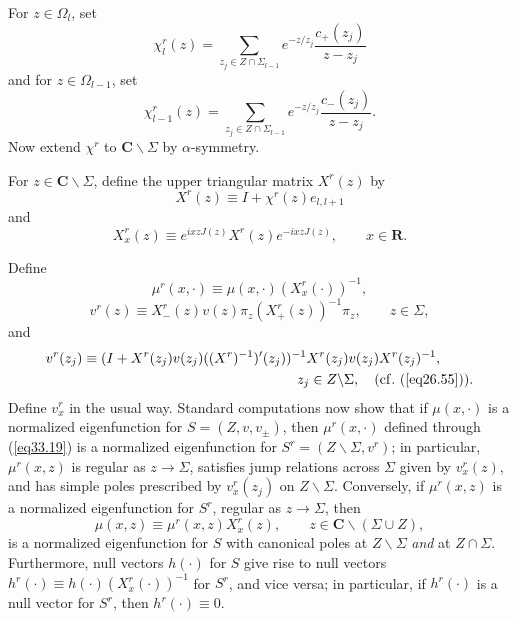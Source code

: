 \documentclass{surv-l}
\theoremstyle{plain}
\theoremstyle{definition}
\numberwithin{equation}{chapter}
\begin{document}
For $z\in\Omega_{l}$, set
\begin{equation*}
\chi_{l}^{r}(z)=\sum_{z_{j}\in Z\cap\Sigma_{l-1}}e^{-z/z_{j}}\frac{c_{+}(z_{j})}{z-z_{j}}
\end{equation*}
and for $z\in\Omega_{l-1}$, set
\begin{equation*}
\chi_{l-1}^{r}(z)=\sum_{z_{j}\in Z\cap\Sigma_{l-1}}e^{-z/z_{j}}\frac{c_{-}(z_{j})}{z-z_{j}}.
\end{equation*}
Now extend $\chi^{r}$ to $ \mathbf{C}\backslash \Sigma$ by $\alpha$-symmetry.

For $ z\in \mathbf{C}\backslash \Sigma$, define the upper triangular matrix $X^{r}(z)$ by
\setcounter{equation}{16}
\begin{equation}\label{eq33.17}
X^{r}(z)\equiv I+\chi^{r}(z)e_{l,l+1}
\end{equation}
and
\begin{equation}\label{eq33.18}
X_{x}^{r}(z)\equiv e^{ixzJ(z)}X^{r}(z)e^{-ixzJ(z)},\qquad x\in \mathbf{R}.
\end{equation}

Define
\begin{equation}\label{eq33.19}
\mu^{r}(x, \cdot)\equiv\mu(x, \cdot)(X_{x}^{r}(\cdot))^{-1},
\end{equation}
\begin{equation}\label{eq33.20}
v^{r}(z)\equiv X_{-}^{r}(z)v(z)\pi_{z}(X_{+}^{r}(z))^{-1}\pi_{z},\qquad  z\in\Sigma,
\end{equation}
and
\begin{align}\label{eq33.21}
& v^{r}(z_{j})\equiv(I+X^{r}(z_{j})v(z_{j})((X^{r})^{-1})'(z_{j}))^{-1}X^{r}(z_{j})v(z_{j})X^{r}(z_{j})^{-1},\\ \nonumber
&\qquad\qquad\qquad\qquad\qquad\qquad\qquad\qquad\qquad z_{j}\in Z\backslash \Sigma,\quad (\mathrm{cf}.\ (\ref{eq26.55})).
 \end{align}
Define $v_{x}^{r}$ in the usual way. Standard computations now show that if $\mu(x, \cdot)$ is a normalized eigenfunction for $S=(Z, v, v_{\pm})$, then $\mu^{r}(x, \cdot)$ defined through (\ref{eq33.19}) is a normalized eigenfunction for $S^{r}=(Z\backslash \Sigma, v^{r})$; in particular, $\mu^{r}(x, z)$ is regular as $ z\rightarrow\Sigma$, satisfies jump relations across $\Sigma$ given by $v_{x}^{r}(z)$, and has simple poles prescribed by $v_{x}^{r}(z_{j})$ on $ Z\backslash \Sigma$. Conversely, if $\mu^{r}(x, z)$ is a normalized eigenfunction for $S^{r}$, regular as $ z\rightarrow\Sigma$, then
\begin{equation}\label{eq33.22}
\mu(x,z)\equiv\mu^{r}(x, z)X_{x}^{r}(z),\qquad z\in \mathbf{C}\backslash (\Sigma\cup Z),
\end{equation}
is a normalized eigenfunction for $S$ with canonical poles at $ Z\backslash \Sigma$ \emph{and} at $ Z\cap\Sigma$. Furthermore, null vectors $h(\cdot)$ for $S$ give rise to null vectors $h^{r}(\cdot)\equiv h(\cdot)(X_{x}^{r}(\cdot))^{-1}$ for $S^{r}$, and vice versa; in particular, if $h^{r}(\cdot)$ is a null vector for $S^{r}$, then $h^{r}(\cdot)\equiv 0$.
\end{document}
